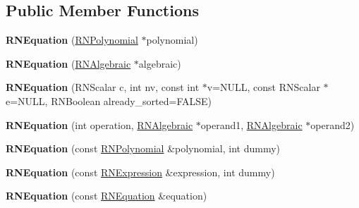 \subsection*{Public Member Functions}
\begin{DoxyCompactItemize}
\item 
{\bfseries R\+N\+Equation} (\hyperlink{class_r_n_polynomial}{R\+N\+Polynomial} $\ast$polynomial)\hypertarget{class_r_n_equation_aa40a0f6d88e89f3991b33a423c228234}{}\label{class_r_n_equation_aa40a0f6d88e89f3991b33a423c228234}

\item 
{\bfseries R\+N\+Equation} (\hyperlink{class_r_n_algebraic}{R\+N\+Algebraic} $\ast$algebraic)\hypertarget{class_r_n_equation_a93e4268eb71997b7fde628b88e06ce20}{}\label{class_r_n_equation_a93e4268eb71997b7fde628b88e06ce20}

\item 
{\bfseries R\+N\+Equation} (R\+N\+Scalar c, int nv, const int $\ast$v=N\+U\+LL, const R\+N\+Scalar $\ast$e=N\+U\+LL, R\+N\+Boolean already\+\_\+sorted=F\+A\+L\+SE)\hypertarget{class_r_n_equation_afb88f75d303592b0f44adabd5061b206}{}\label{class_r_n_equation_afb88f75d303592b0f44adabd5061b206}

\item 
{\bfseries R\+N\+Equation} (int operation, \hyperlink{class_r_n_algebraic}{R\+N\+Algebraic} $\ast$operand1, \hyperlink{class_r_n_algebraic}{R\+N\+Algebraic} $\ast$operand2)\hypertarget{class_r_n_equation_a5f0f0429e86ee524930153e62d10d579}{}\label{class_r_n_equation_a5f0f0429e86ee524930153e62d10d579}

\item 
{\bfseries R\+N\+Equation} (const \hyperlink{class_r_n_polynomial}{R\+N\+Polynomial} \&polynomial, int dummy)\hypertarget{class_r_n_equation_a178cae4f939925bbb052428e6e9a9745}{}\label{class_r_n_equation_a178cae4f939925bbb052428e6e9a9745}

\item 
{\bfseries R\+N\+Equation} (const \hyperlink{class_r_n_algebraic}{R\+N\+Expression} \&expression, int dummy)\hypertarget{class_r_n_equation_aa37ba3ddc27d759150c298fca33e6fb8}{}\label{class_r_n_equation_aa37ba3ddc27d759150c298fca33e6fb8}

\item 
{\bfseries R\+N\+Equation} (const \hyperlink{class_r_n_equation}{R\+N\+Equation} \&equation)\hypertarget{class_r_n_equation_af5d1a4d58f49d6d0c69d761a6951326f}{}\label{class_r_n_equation_af5d1a4d58f49d6d0c69d761a6951326f}


\end{DoxyCompactItemize}
